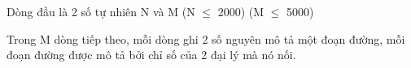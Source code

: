 Dòng đầu là 2 số tự nhiên N và M (N $\le$ 2000) (M $\le$ 5000)

Trong M dòng tiếp theo, mỗi dòng ghi 2 số nguyên mô tả một đoạn đường, mỗi đoạn đường được mô tả bởi chỉ số của 2 đại lý mà nó nối.